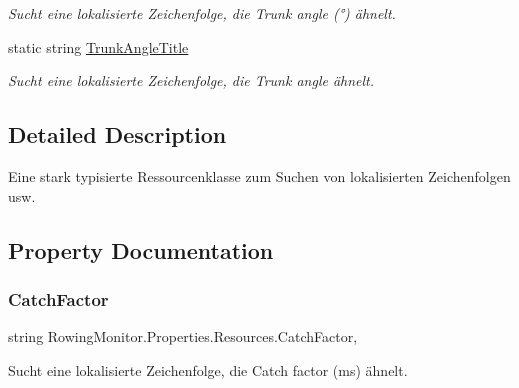 \begin{DoxyCompactItemize}
\begin{DoxyCompactList}\small\item\em Sucht eine lokalisierte Zeichenfolge, die Trunk angle (°) ähnelt. \end{DoxyCompactList}\item 
static string \hyperlink{class_rowing_monitor_1_1_properties_1_1_resources_a8e28b98be3db69f55589b3fd45ef4afd}{Trunk\+Angle\+Title}
\begin{DoxyCompactList}\small\item\em Sucht eine lokalisierte Zeichenfolge, die Trunk angle ähnelt. \end{DoxyCompactList}\end{DoxyCompactItemize}


\subsection{Detailed Description}
Eine stark typisierte Ressourcenklasse zum Suchen von lokalisierten Zeichenfolgen usw. 



\subsection{Property Documentation}
\mbox{\label{class_rowing_monitor_1_1_properties_1_1_resources_a387e94c12ed72def984e5c51c268cf0a}} 
\subsubsection{\texorpdfstring{Catch\+Factor}{CatchFactor}}
{\footnotesize\ttfamily string Rowing\+Monitor.\+Properties.\+Resources.\+Catch\+Factor\hspace{0.3cm}{\ttfamily [static]}, {\ttfamily [get]}}



Sucht eine lokalisierte Zeichenfolge, die Catch factor (ms) ähnelt. 

\mbox{\label{class_rowing_monitor_1_1_properties_1_1_resources_a1a12bdf0feea59667d2d272370806cfa}} 
